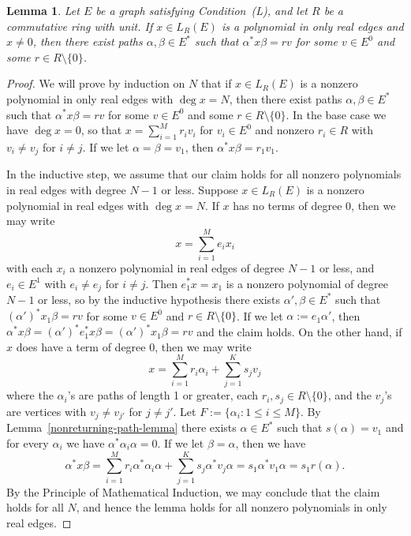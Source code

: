 \documentclass[11pt]{amsart}
\newtheorem{lemma}[theorem]{Lemma}
\theoremstyle{remark}
\numberwithin{equation}{section}
\begin{document}
\begin{lemma} \label{shift-real-to-vertex-lem}
Let $E$ be a graph satisfying Condition~(L), and let $R$ be a commutative ring with unit.  If $x \in L_R(E)$ is a polynomial in only real edges and $x \neq 0$, then there exist paths $\alpha, \beta \in E^*$ such that $\alpha^* x \beta = rv$ for some $v \in E^0$ and some $r \in R \setminus \{ 0 \}$.
\end{lemma}

\begin{proof}
We will prove by induction on $N$ that if $x \in L_R(E)$ is a nonzero polynomial in only real edges with $\operatorname{deg} x = N$, then there exist paths $\alpha, \beta \in E^*$ such that $\alpha^* x \beta = rv$ for some $v \in E^0$ and some $r \in R \setminus \{ 0 \}$.  In the base case we have $\operatorname{deg} x = 0$, so that $x = \sum_{i=1}^M r_i v_i$ for $v_i \in E^0$ and nonzero $r_i \in R$ with $v_i \neq v_j$ for $i \neq j$.  If we let $\alpha = \beta = v_1$, then $\alpha^* x \beta = r_1 v_1$.

In the inductive step, we assume that our claim holds for all nonzero polynomials in real edges with degree $N-1$ or less.  Suppose $x \in L_R(E)$ is a nonzero polynomial in real edges with $\operatorname{deg} x = N$.  If $x$ has no terms of degree 0, then we may write $$x = \sum_{i=1}^M e_i x_i $$ with each $x_i$ a nonzero polynomial in real edges of degree $N-1$ or less, and $e_i \in E^1$ with $e_i \neq e_j$ for $i \neq j$.  Then $e_1^* x = x_1$ is a nonzero polynomial of degree $N-1$ or less, so by the inductive hypothesis there exists $\alpha', \beta \in E^*$ such that $(\alpha')^* x_1 \beta = rv$ for some $v \in E^0$ and $r \in R \setminus \{ 0 \}$.  If we let $\alpha := e_1 \alpha'$, then $\alpha^* x \beta = (\alpha')^* e_1^*x \beta = (\alpha')^* x_1 \beta =  rv$ and the claim holds.  On the other hand, if $x$ does have a term of degree 0, then we may write $$x = \sum_{i=1}^M r_i \alpha_i  + \sum_{j=1}^K s_j v_j$$ where the $\alpha_i$'s are paths of length 1 or greater, each $r_i, s_j \in R \setminus \{ 0 \}$, and the $v_j$'s are vertices with $v_j \neq v_{j'}$ for $j \neq j'$.  Let $F := \{ \alpha_i : 1 \leq i \leq M \}$.  By Lemma~\ref{nonreturning-path-lemma} there exists $\alpha \in E^*$ such that $s(\alpha)=v_1$ and for every $\alpha_i$ we have $\alpha^* \alpha_i \alpha = 0$.  If we let $\beta= \alpha$, then we have $$\alpha^* x \beta = \sum_{i=1}^M r_i \alpha^* \alpha_i \alpha + \sum_{j=1}^K s_j \alpha^* v_j \alpha = s_1 \alpha^* v_1 \alpha = s_1 r(\alpha).$$  By the Principle of Mathematical Induction, we may conclude that the claim holds for all $N$, and hence the lemma holds for all nonzero polynomials in only real edges.
\end{proof}
\end{document}
